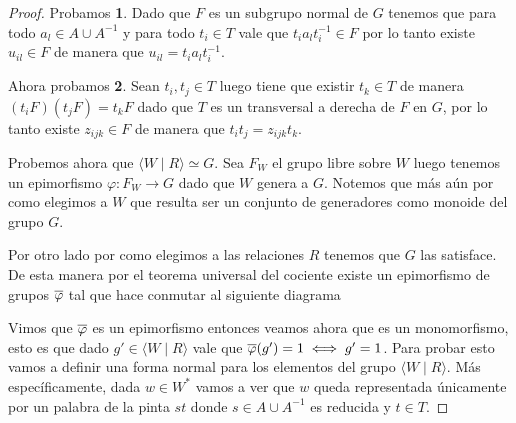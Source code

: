 \documentclass[tesis.tex]{subfiles}
\begin{document}
	
	\begin{proof}
		Probamos \textbf{1}.
		Dado que $F$ es un subgrupo normal de $G$ tenemos que para todo $a_{l} \in A \cup A^{-1}$ y para todo $t_{i} \in T$ vale que $t_{i}a_{l}t_{i}^{-1} \in F$ por lo tanto existe $u_{il} \in F$ de manera que $u_{il} = t_{i}a_{l}t_{i}^{-1}$.

		Ahora probamos \textbf{2}.
		Sean $t_{i},t_{j} \in T$ luego tiene que existir $t_{k} \in T$ de manera $(t_{i}F)(t_{j}F) = t_{k} F$ dado que $T$ es un transversal a derecha de $F$ en $G$, por lo tanto existe $z_{ijk} \in F$ de manera que $t_{i}t_{j} = z_{ijk}t_{k}$.

		Probemos ahora que $\langle W \mid R \rangle \simeq G$.
		Sea $F_{W}$ el grupo libre sobre $W$ luego tenemos un epimorfismo $\varphi:F_{W} \to G$ dado que $W$ genera a $G$.
		Notemos que más aún por como elegimos a $W$ que resulta ser un conjunto de generadores como monoide del grupo $G$. 

		Por otro lado por como elegimos a las relaciones $R$ tenemos que $G$ las satisface.
		De esta manera por el teorema universal del cociente existe un epimorfismo de grupos $\overline \varphi$ tal que hace conmutar al siguiente diagrama	
		\begin{center}
		\end{center}
		
		Vimos que $\overline \varphi$ es un epimorfismo entonces veamos ahora que es un monomorfismo, esto es que dado $g' \in \langle W \mid R \rangle$ vale que $\overline{\varphi}(g') = 1 \iff g' = 1$.
		Para probar esto vamos a definir una forma normal para los elementos del grupo $\langle W \mid R \rangle$.
		Más específicamente, dada $w \in W^{*}$ vamos a ver que $w$ queda representada únicamente por un palabra de la pinta $st$ donde $s \in A \cup A^{-1}$ es reducida y $t \in T$. 
		


\end{proof}
\end{document}
